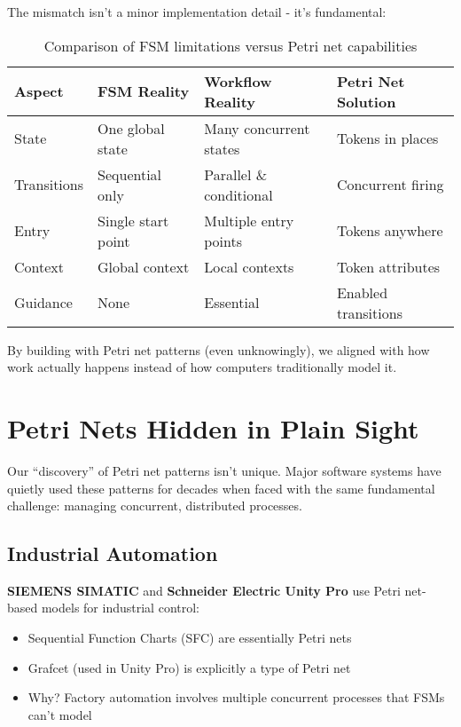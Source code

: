 \documentclass[11pt,a4paper]{article}
\begin{document}
The mismatch isn't a minor implementation detail - it's fundamental:

\begin{table}[H]
\centering
\begin{tabularx}{\textwidth}{|l|X|X|X|}
\hline
\textbf{Aspect} & \textbf{FSM Reality} & \textbf{Workflow Reality} & \textbf{Petri Net Solution} \\
\hline
State & One global state & Many concurrent states & Tokens in places \\
\hline
Transitions & Sequential only & Parallel \& conditional & Concurrent firing \\
\hline
Entry & Single start point & Multiple entry points & Tokens anywhere \\
\hline
Context & Global context & Local contexts & Token attributes \\
\hline
Guidance & None & Essential & Enabled transitions \\
\hline
\end{tabularx}
\caption{Comparison of FSM limitations versus Petri net capabilities}
\end{table}

By building with Petri net patterns (even unknowingly), we aligned with how work actually happens instead of how computers traditionally model it.

\section{Petri Nets Hidden in Plain Sight}

Our ``discovery'' of Petri net patterns isn't unique. Major software systems have quietly used these patterns for decades when faced with the same fundamental challenge: managing concurrent, distributed processes.

\subsection{Industrial Automation}
\textbf{SIEMENS SIMATIC} and \textbf{Schneider Electric Unity Pro} use Petri net-based models for industrial control:
\begin{itemize}
\item Sequential Function Charts (SFC) are essentially Petri nets
\item Grafcet (used in Unity Pro) is explicitly a type of Petri net
\item Why? Factory automation involves multiple concurrent processes that FSMs can't model
\end{itemize}
\end{document}

